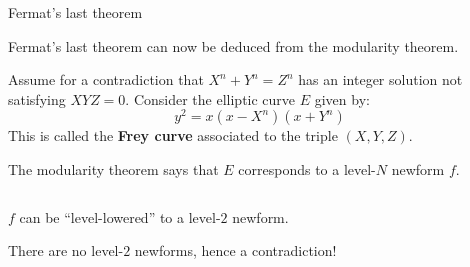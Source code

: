 \documentclass[10pt]{beamer}
\theoremstyle{definition}
\begin{document}
\begin{frame}[t]{Fermat's last theorem}

Fermat's last theorem can now be deduced from the modularity theorem.

\vspace{0.5cm} Assume for a contradiction that $ X^n + Y^n = Z^n $ has an integer solution not satisfying $ XYZ = 0 $. Consider the elliptic curve $ E $ given by:
$$ y^2 = x(x - X^n)(x + Y^n) $$
This is called the \textbf{Frey curve} associated to the triple $ (X, Y, Z) $.

\vspace{0.5cm} The modularity theorem says that $ E $ corresponds to a level-$ N $ newform $ f $.

\begin{columns}[T]

\begin{column}{0.8\textwidth}
\vspace{0.5cm}

\begin{theorem}[Ribet]
$ f $ can be ``level-lowered'' to a level-$ 2 $ newform.
\end{theorem}

\vspace{0.5cm} There are no level-$ 2 $ newforms, hence a contradiction!
\end{column}


\end{columns}
\end{frame}
\end{document}

